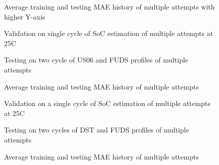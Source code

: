 \begin{figure*}[htbp]
    \centering
    \begin{subfigure}[b]{0.325\textwidth}
        \centering
        
        \caption{Average training and testing MAE history of multiple attempts with higher Y-axis}
    \end{subfigure}
    \hfill
    \begin{subfigure}[b]{0.325\textwidth}
        \centering
        
        \caption{Validation on single cycle of SoC estimation of multiple attempts at 25\textdegree{}C}
    \end{subfigure}
    \hfill
    \begin{subfigure}[b]{0.325\textwidth}
        \centering
        
        \caption{Testing on two cycle of US06 and FUDS profiles of multiple attempts}
        \label{subfig:Model-5res-DSTvsFUDS}
    \end{subfigure}
    \begin{subfigure}[b]{0.325\textwidth}
        \centering
        
        \caption{Average training and testing MAE history of multiple attempts}
    \end{subfigure}
    \hfill
    \begin{subfigure}[b]{0.325\textwidth}
        \centering
        
        \caption{Validation on a single cycle of SoC estimation of multiple attempts at 25\textdegree{}C}
    \end{subfigure}
    \hfill
    \begin{subfigure}[b]{0.325\textwidth}
        \centering
        
        \caption{Testing on two cycles of DST and FUDS profiles of multiple attempts}
    \end{subfigure}
    \begin{subfigure}[b]{0.325\textwidth}
        \centering
        
        \caption{Average training and testing MAE history of multiple attempts}

\end{subfigure}
\end{figure*}
